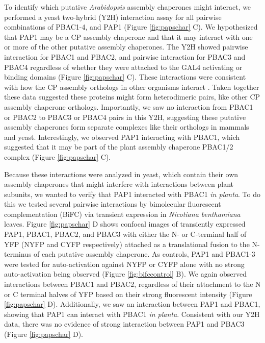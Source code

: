 To identify which putative \textit{Arabidopsis} assembly chaperones might interact, we performed a yeast two-hybrid (Y2H) interaction assay for all pairwise combinations of PBAC1-4, and PAP1 (Figure \ref{fig:papschar} C). We hypothesized that PAP1 may be a CP assembly chaperone and that it may interact with one or more of the other putative assembly chaperones. The Y2H showed pairwise interaction for PBAC1 and PBAC2, and pairwise interaction for PBAC3 and PBAC4 regardless of whether they were attached to the GAL4 activating or binding domains (Figure \ref{fig:papschar} C). These interactions were consistent with how the CP assembly orthologs in other organisms interact \citep{murata09}.  Taken together these data suggested these proteins might form heterodimeric pairs, like other CP assembly chaperone orthologs. Importantly, we saw no interaction from PBAC1 or PBAC2 to PBAC3 or PBAC4 pairs in this Y2H, suggesting these putative assembly chaperones form separate complexes like their orthologs in mammals and yeast. Interestingly, we observed PAP1 interacting with PBAC1, which suggested that it may be part of the plant assembly chaperone PBAC1/2 complex (Figure \ref{fig:papschar} C). 

Because these interactions were analyzed in yeast, which contain their own assembly chaperones that might interfere with interactions between plant subunits, we wanted to verify that PAP1 interacted with PBAC1 \textit{in planta}. To do this we tested several pairwise interactions by bimolecular fluorescent complementation (BiFC) via transient expression in \textit{Nicotiana benthamiana} leaves. Figure \ref {fig:papschar} D shows confocal images of transiently expressed PAP1, PBAC1, PBAC2, and PBAC3 with either the N- or C-terminal half of YFP (NYFP and CYFP respectively) attached as a translational fusion to the N-terminus of each putative assembly chaperone. As controls, PAP1 and PBAC1-3 were tested for auto-activation against NYFP or CYFP alone with no strong auto-activation being observed (Figure \ref{fig:bifccontrol} B). We again observed interactions between PBAC1 and PBAC2, regardless of their attachment to the N or C terminal halves of YFP based on their strong fluorescent intensity (Figure \ref{fig:papschar} D). Additionally, we saw an interaction between PAP1 and PBAC1, showing that PAP1 can interact with PBAC1 \textit{in planta}.  Consistent with our Y2H data, there was no evidence of strong interaction between PAP1 and PBAC3 (Figure \ref{fig:papschar} D). 

\FloatBarrier

